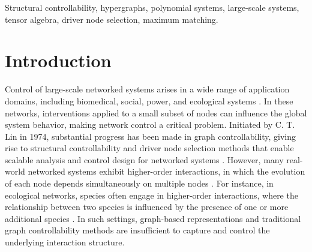 \documentclass[journal,twoside,web]{ieeecolor}
\begin{document}
\begin{keywords}
    Structural controllability, hypergraphs, polynomial  systems, large-scale systems, tensor algebra, driver node selection, maximum matching.
\end{keywords}

\section{Introduction}
Control of large-scale networked systems arises in a wide range of application domains, including biomedical, social, power, and ecological systems \cite{li2019control, kandhway2016using,ouammi2014optimal,liu2024control}.
%
In these networks, interventions applied to a small subset of nodes can influence the global system behavior, making network control a critical problem.
%
Initiated by C. T. Lin in 1974, substantial progress has been made in graph controllability, giving rise to structural controllability and driver node selection methods that enable scalable analysis and control design for networked systems \cite{lin1974structural, shields1976structural, mayeda1979strong, liu2011controllability, mousavi2017structural, menara2018structural,d2023controlling}.
%
However, many real-world networked systems exhibit higher-order interactions, in which the evolution of each node depends simultaneously on multiple nodes \cite{benson2016higher, zhu2018social, higham2021epidemics, dotson2022deciphering, bick2023higher, alge2024continuous,delabays2025hypergraph}.
%
For instance, in ecological networks, species often engage in higher-order interactions, where the relationship between two species is influenced by the presence of one or more additional species \cite{golubski2016ecological}.
%
In such settings, graph-based representations and traditional graph controllability methods are insufficient to capture and control the underlying interaction structure.
\end{document}
